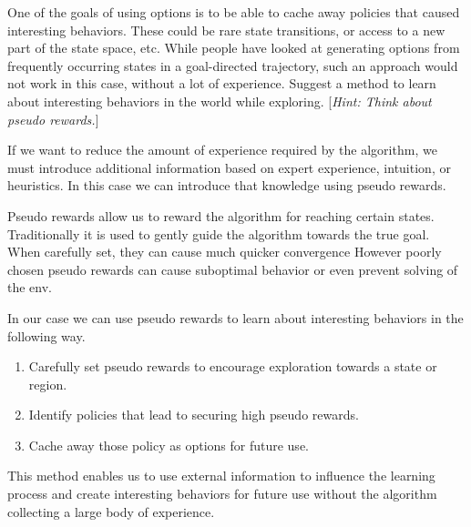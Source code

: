 \documentclass[addpoints,12pt,solution]{exam}
\begin{document}
\begin{questions}
\begin{solution}
        \end{solution}

        \question[4] One of the goals of using options is to be able to cache away policies that caused interesting behaviors. These could be rare state transitions, or access to a new part of the state space, etc. While people have looked at generating options from frequently occurring states in a goal-directed trajectory, such an approach would not work in this case, without a lot of experience. Suggest a method to learn about interesting behaviors in the world while exploring. [\textit{Hint: Think about pseudo rewards.}]
        \begin{solution}
            If we want to reduce the amount of experience required by the algorithm, we must introduce additional
            information based on expert experience, intuition, or heuristics. In this case we can introduce that
            knowledge using pseudo rewards.

            Pseudo rewards allow us to reward the algorithm for reaching certain states. Traditionally it is used to
            gently guide the algorithm towards the true goal. When carefully set, they can cause much quicker convergence
            However poorly chosen pseudo rewards can cause suboptimal behavior or even prevent solving of the env.

            In our case we can use pseudo rewards to learn about interesting behaviors in the following way.
            \begin{enumerate}
                \item Carefully set pseudo rewards to encourage exploration towards a state or region.
                \item Identify policies that lead to securing high pseudo rewards.
                \item Cache away those policy as options for future use.
            \end{enumerate}

            This method enables us to use external information to influence the learning process and create interesting
            behaviors for future use without the algorithm collecting a large body of experience.
        \end{solution}

    \end{questions}
\end{document}
